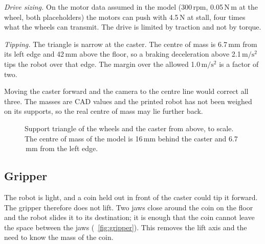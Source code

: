 \documentclass[conference,a4paper]{IEEEtran}
\newcommand{\unit}[1]{\ensuremath{\,\mathrm{#1}}}
\begin{document}
\emph{Drive sizing.} On the motor data assumed in the model (300\unit{rpm}, 0.05\unit{N\,m}
at the wheel, both placeholders) the motors can push with 4.5\unit{N} at stall, four times
what the wheels can transmit. The drive is limited by traction and not by torque.

\emph{Tipping.} The triangle is narrow at the caster. The centre of mass is 6.7\unit{mm}
from its left edge and 42\unit{mm} above the floor, so a braking deceleration above
2.1\unit{m/s^2} tips the robot over that edge. The margin over the allowed 1.0\unit{m/s^2}
is a factor of two.

Moving the caster forward and the camera to the centre line would correct all three. The
masses are CAD values and the printed robot has not been weighed on its supports, so the
real centre of mass may lie further back.

\begin{figure}[t]
  \centering
  \caption{Support triangle of the wheels and the caster from above, to scale. The centre of
  mass of the model is 16\unit{mm} behind the caster and 6.7\unit{mm} from the left edge.}
  \label{fig:triangle}
\end{figure}

\subsection{Gripper}
The robot is light, and a coin held out in front of the caster could tip it forward. The
gripper therefore does not lift. Two jaws close around the coin on the floor and the robot
slides it to its destination; it is enough that the coin cannot leave the space between the
jaws (\figurename~\ref{fig:gripper}). This removes the lift axis and the need to know the
mass of the coin.
\end{document}
